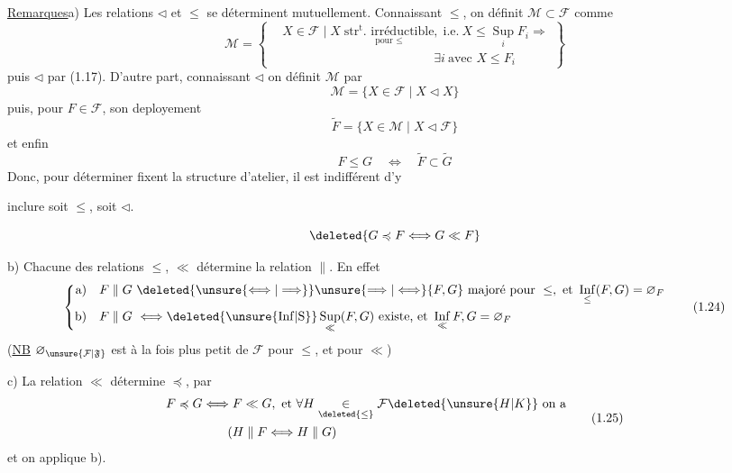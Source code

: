 \uline{Remarques}\quad a) Les relations $\triangleleft$ et $\leq$ se déterminent mutuellement. Connaissant $\leq$, on définit $\mathcal{M}\subset\mathcal{F}$ comme
\[
\mathcal{M}=\left\{\begin{aligned}
&X\in\mathcal{F}\mid X\;
\underset{\text{pour }\leq}{\text{$\mathrm{str}^{\mathrm{t}}$. irréductible}},\;
\text{i.e.}\ X\leq\mathop{\mathrm{Sup}}\limits_i F_i\Rightarrow\\
&\hspace{12em}\exists i\ \text{avec }X\leq F_i
\end{aligned}\right\}
\tag*{(1.20)}
\]
puis $\triangleleft$ par (1.17).
 D'autre part, connaissant $\triangleleft$ on définit $\mathcal{M}$ par
\[
\mathcal{M}=\{X\in\mathcal{F}\mid X\triangleleft X\} \tag*{(1.21)}
\]
puis, pour $F\in\mathcal{F}$, son deployement
\[
\widetilde F=\{X\in\mathcal{M}\mid X\triangleleft\mathcal{F}\} \tag*{(1.22)}
\]
et enfin
\[
F\leq G\quad\Longleftrightarrow\quad\widetilde F\subset\widetilde G \tag*{(1,23)}
\]
Donc, pour déterminer   fixent la structure d'atelier, il est indifférent d'y

inclure soit $\leq$, soit $\triangleleft$.

\[
\deleted{G\preccurlyeq F\Longleftrightarrow G\ll F}
\]

b) Chacune des relations $\leq$, $\ll$ détermine la relation $\parallel$. En effet
\[
\left\{\begin{aligned}
\text{a)}\quad F\parallel G &\ \deleted{\unsure{\Longleftrightarrow|\Longrightarrow}}\unsure{\Longrightarrow|\Longleftrightarrow}
 \{F,G\}\ \text{majoré pour }\leq,\ \text{et }\mathop{\mathrm{Inf}}\limits_{\leq}(F,G)=\varnothing_F\\
\text{b)}\quad F\parallel G &\ \Longleftrightarrow
 \deleted{\unsure{\mathrm{Inf}|\mathrm{S}}}\mathop{\mathrm{Sup}}\limits_{\ll}(F,G)\ \text{existe, et }\mathop{\mathrm{Inf}}\limits_{\ll} F,G=\varnothing_F
\end{aligned}\right.
\tag*{(1.24)}
\]
(\uline{NB} $\varnothing_{\unsure{\mathcal{F}|\mathfrak{F}}}$ est à la fois plus petit  de $\mathcal{F}$ pour $\leq$, et pour $\ll$)

c) La relation $\ll$ détermine $\preccurlyeq$, par
\margin{$\times$}
\[
\begin{aligned}
F\preccurlyeq G &\Longleftrightarrow F\ll G,\ \text{et }\forall H\underset{\deleted{\leq}}{\in}\mathcal{F}\deleted{\unsure{H|K}}\ \text{on a}\\
&\hspace{2em}(H\parallel F\Longleftrightarrow H\parallel G)
\end{aligned}
\tag*{(1.25)}
\]
et on applique b).

